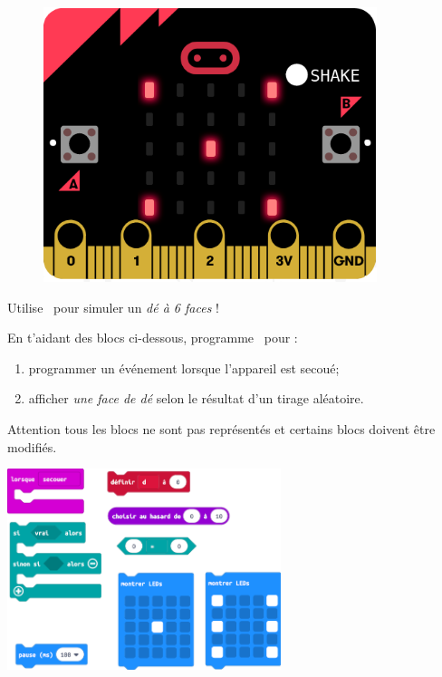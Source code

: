\begin{figure}
    \includegraphics[width=\linewidth]{res/mbDe6FacesN2.png}
\end{figure}
\begin{eleve}
Utilise \mb~pour simuler un \emph{dé à 6 faces} !

En t'aidant des blocs ci-dessous, programme \mb~pour : 
\begin{enumerate}
    \item programmer un événement lorsque l'appareil est secoué;
    \item afficher \emph{une face de dé} selon le résultat d'un tirage aléatoire.
\end{enumerate}
Attention tous les blocs ne sont pas représentés et certains blocs doivent être modifiés.

\includegraphics[width=0.6\textwidth]{res/mbDe6FacesN2blocs.png}

\end{eleve}

